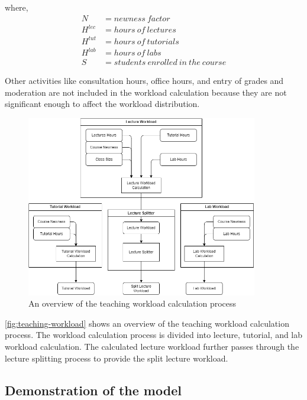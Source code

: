 where,
\begin{equation*}
  \nonumber
  \begin{aligned}
    N       & = newness\ factor                     \\
    H^{lec} & = hours\ of\ lectures                 \\
    H^{tut} & = hours\ of\ tutorials                \\
    H^{lab} & = hours\ of\ labs                     \\
    S       & = students\ enrolled\ in\ the\ course
  \end{aligned}
\end{equation*}

Other activities like consultation hours, office hours, and entry of grades and moderation are not included in the workload calculation because they are not significant enough to affect the workload distribution.

\begin{figure}[ht]
  \centering
  \includegraphics[width=0.9\textwidth]{images/teaching_workload.png}
  \caption{An overview of the teaching workload calculation process}
  \label{fig:teaching-workload}
\end{figure}

\autoref{fig:teaching-workload} shows an overview of the teaching workload calculation process. The workload calculation process is divided into lecture, tutorial, and lab workload calculation. The calculated lecture workload further passes through the lecture splitting process to provide the split lecture workload.


\subsection{Demonstration of the model}
\label{sec:workload_demo}

